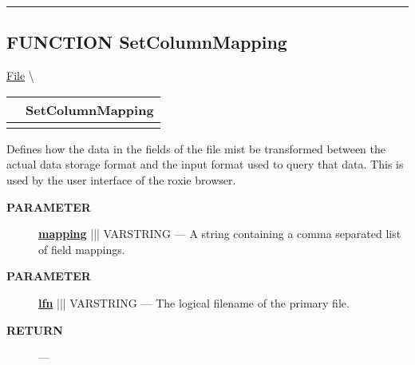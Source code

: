 \rule{\linewidth}{0.5pt}
\subsection*{\textsf{\colorbox{headtoc}{\color{white} FUNCTION}
SetColumnMapping}}

\hypertarget{ecldoc:file.setcolumnmapping}{}
\hspace{0pt} \hyperlink{ecldoc:File}{File} \textbackslash 

{\renewcommand{\arraystretch}{1.5}
\begin{tabularx}{\textwidth}{|>{\raggedright\arraybackslash}l|X|}
\hline
\hspace{0pt}\mytexttt{\color{red} } & \textbf{SetColumnMapping} \\
\hline
\multicolumn{2}{|>{\raggedright\arraybackslash}X|}{\hspace{0pt}\mytexttt{\color{param} (varstring lfn, varstring mapping)}} \\
\hline
\end{tabularx}
}

\par





Defines how the data in the fields of the file mist be transformed between the actual data storage format and the input format used to query that data. This is used by the user interface of the roxie browser.






\par
\begin{description}
\item [\colorbox{tagtype}{\color{white} \textbf{\textsf{PARAMETER}}}] \textbf{\underline{mapping}} ||| VARSTRING --- A string containing a comma separated list of field mappings.
\item [\colorbox{tagtype}{\color{white} \textbf{\textsf{PARAMETER}}}] \textbf{\underline{lfn}} ||| VARSTRING --- The logical filename of the primary file.
\end{description}







\par
\begin{description}
\item [\colorbox{tagtype}{\color{white} \textbf{\textsf{RETURN}}}] \textbf{} --- 
\end{description}





